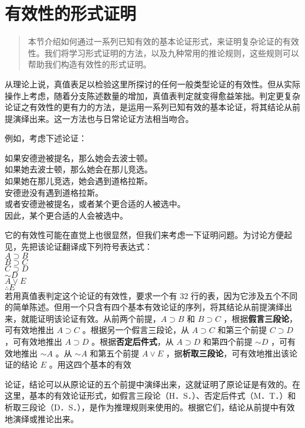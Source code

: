 \section{有效性的形式证明}

\begin{quotation}
本节介绍如何通过一系列已知有效的基本论证形式，来证明复杂论证的有效性。我们将学习形式证明的方法，以及九种常用的推论规则，这些规则可以帮助我们构造有效性的形式证明。
\end{quotation}

从理论上说，真值表足以检验这里所探讨的任何一般类型论证的有效性。但从实际操作上考虑，随着分支陈述数量的增加，真值表判定就变得愈益笨拙。判定更复杂论证之有效性的更有力的方法，是运用一系列已知有效的基本论证，将其结论从前提演绎出来。这一方法也与日常论证方法相当吻合。

例如，考虑下述论证：

如果安德逊被提名，那么她会去波士顿。\\
如果她去波士顿，那么她会在那儿竞选。\\
如果她在那儿竞选，她会遇到道格拉斯。\\
安德逊没有遇到道格拉斯。\\
或者安德逊被提名，或者某个更合适的人被选中。\\
因此，某个更合适的人会被选中。

它的有效性可能在直觉上也很显然，但我们来考虑一下证明问题。为讨论方便起见，先把该论证翻译成下列符号表达式：\\
$A \supset B$\\
$B \supset C$\\
$C \supset D$\\
$\sim D$\\
$A \vee E$\\
$\therefore E$\\
若用真值表判定这个论证的有效性，要求一个有 32 行的表，因为它涉及五个不同的简单陈述。但用一个只含有四个基本有效论证的序列，将其结论从前提演绎出来，就能证明该论证有效。从前两个前提，$A \supset B$ 和 $B \supset C$ ，根据\textbf{假言三段论}，可有效地推出 $A \supset C$ 。根据另一个假言三段论，从 $A \supset C$ 和第三个前提 $C \supset D$ ，可有效地推出 $A \supset D$ 。根据\textbf{否定后件式}，从 $A \supset D$ 和第四个前提 $\sim D$ ，可有效地推出 $\sim A$ 。从 $\sim A$ 和第五个前提 $A \vee E$ ，据\textbf{析取三段论}，可有效地推出该论证的结论 $E$ 。用这四个基本的有效

论证，结论可以从原论证的五个前提中演绎出来，这就证明了原论证是有效的。在这里，基本的有效论证形式，如假言三段论（H．S．）、否定后件式（M．T．）和析取三段论（D．S．），是作为推理规则来使用的。根据它们，结论从前提中有效地演绎或推论出来。

